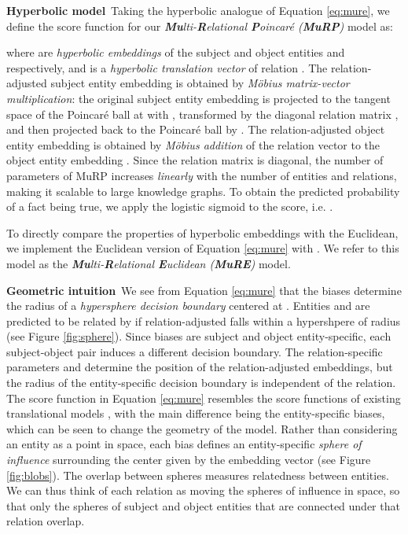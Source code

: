 \documentclass{article}
\newcommand{\keypoint}[1]{\vspace{0.cm}\noindent\textbf{#1}\,}
\begin{document}
\keypoint{Hyperbolic model} Taking the hyperbolic analogue of Equation \ref{eq:mure}, we define the score function for our \textit{\textbf{Mu}lti-\textbf{R}elational \textbf{P}oincar{\'e} (\textbf{MuRP})} model as:

where  are \textit{hyperbolic embeddings} of the subject and object entities  and  respectively, and  is a \textit{hyperbolic translation vector} of relation . The relation-adjusted subject entity embedding  is obtained by \textit{Möbius matrix-vector multiplication}: the original subject entity embedding  is projected to the tangent space of the Poincar{\'e} ball at  with , transformed by the diagonal relation matrix , and then projected back to the Poincar{\'e} ball by . The relation-adjusted object entity embedding  is obtained by \textit{Möbius addition} of the relation vector  to the object entity embedding . Since the relation matrix  is diagonal, the number of parameters of MuRP increases \textit{linearly} with the number of entities and relations, making it scalable to large knowledge graphs. To obtain the predicted probability of a fact being true, we apply the logistic sigmoid to the score, i.e. . 

To directly compare the properties of hyperbolic embeddings with the Euclidean, we implement the Euclidean version of Equation \ref{eq:mure} with . We refer to this model as the \textit{\textbf{Mu}lti-\textbf{R}elational \textbf{E}uclidean (\textbf{MuRE})} model.

\keypoint{Geometric intuition} We see from Equation \ref{eq:mure} that the biases  determine the radius of a \textit{hypersphere decision boundary} centered at .  Entities  and  are predicted to be related by  if relation-adjusted  falls within a hypershpere of radius  (see Figure \ref{fig:sphere}). Since biases are subject and object entity-specific, each subject-object pair induces a different decision boundary. The relation-specific parameters  and  determine the position of the relation-adjusted embeddings, but the radius of the entity-specific decision boundary is independent of the relation. The score function in Equation \ref{eq:mure} resembles the score functions of existing translational models \cite{bordes2013translating, feng2016knowledge, nguyen2016stranse}, with the main difference being the entity-specific biases, which can be seen to change the geometry of the model. Rather than considering an entity as a point in space, each bias defines an entity-specific \textit{sphere of influence} surrounding the center given by the embedding vector (see Figure \ref{fig:blobs}). The overlap between spheres measures relatedness between entities. We can thus think of each relation as moving the spheres of influence in space, so that only the spheres of subject and object entities that are connected under that relation overlap.
\end{document}
